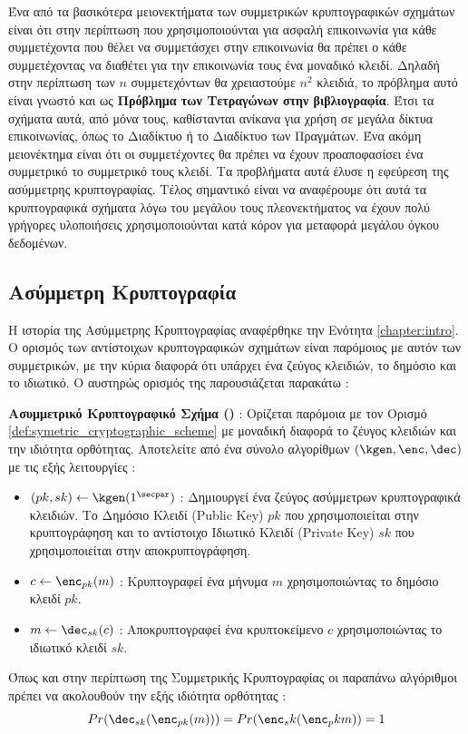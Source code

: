 Ένα από τα βασικότερα μειονεκτήματα των συμμετρικών κρυπτογραφικών σχημάτων είναι ότι στην περίπτωση που χρησιμοποιούνται για ασφαλή επικοινωνία για κάθε συμμετέχοντα που θέλει να συμμετάσχει στην επικοινωνία θα πρέπει ο κάθε συμμετέχοντας να διαθέτει για την επικοινωνία τους ένα μοναδικό κλειδί. Δηλαδή στην περίπτωση των $n$ συμμετεχόντων θα χρειαστούμε $n^2$ κλειδιά, το πρόβλημα αυτό είναι γνωστό και ως \textbf{Πρόβλημα των Τετραγώνων στην βιβλιογραφία}. Έτσι τα σχήματα αυτά, από μόνα τους, καθίστανται ανίκανα για χρήση σε μεγάλα δίκτυα επικοινωνίας, όπως το Διαδίκτυο ή το Διαδίκτυο των Πραγμάτων. Ένα ακόμη μειονέκτημα είναι ότι οι συμμετέχοντες θα πρέπει να έχουν προαποφασίσει ένα συμμετρικό το συμμετρικό τους κλειδί. Τα προβλήματα αυτά έλυσε η εφεύρεση της ασύμμετρης κρυπτογραφίας. Τέλος σημαντικό είναι να αναφέρουμε ότι αυτά τα κρυπτογραφικά σχήματα λόγω του μεγάλου τους πλεονεκτήματος να έχουν πολύ γρήγορες υλοποιήσεις χρησιμοποιούνται κατά κόρον για μεταφορά μεγάλου όγκου δεδομένων.

\subsection{Ασύμμετρη Κρυπτογραφία}

Η ιστορία της Ασύμμετρης Κρυπτογραφίας αναφέρθηκε την Ενότητα \ref{chapter:intro}. Ο ορισμός των αντίστοιχων κρυπτογραφικών σχημάτων είναι παρόμοιος με αυτόν των συμμετρικών, με την κύρια διαφορά ότι υπάρχει ένα ζεύγος κλειδιών, το δημόσιο και το ιδιωτικό. Ο αυστηρώς ορισμός της παρουσιάζεται παρακάτω :

\begin{definition}
\label{def:assymetric_cryptographic_scheme}
\textbf{Ασυμμετρικό Κρυπτογραφικό Σχήμα ()} : Ορίζεται παρόμοια με τον Ορισμό \ref{def:symetric_cryptographic_scheme} με μοναδική διαφορά το ζέυγος κλειδιών και την ιδιότητα ορθότητας. Αποτελείτε από ένα σύνολο αλγορίθμων $(\kgen, \enc, \dec)$ με τις εξής λειτουργίες :
\begin{itemize}
    \item $(pk, sk) \leftarrow \kgen(1^\secpar)$ : Δημιουργεί ένα ζεύγος ασύμμετρων κρυπτογραφικά κλειδιών. Το Δημόσιο Κλειδί (Public Key) $pk$ που χρησιμοποιείται στην κρυπτογράφηση και το αντίστοιχο Ιδιωτικό Κλειδί (Private Key) $sk$ που χρησιμοποιείται στην αποκρυπτογράφηση.
    \item $c \leftarrow \enc_{pk}(m)$ : Κρυπτογραφεί ένα μήνυμα $m$ χρησιμοποιώντας το δημόσιο κλειδί $pk$.
    \item $m \leftarrow \dec_{sk}(c)$ : Αποκρυπτογραφεί ένα κρυπτοκείμενο $c$ χρησιμοποιώντας το ιδιωτικό κλειδί $sk$.
\end{itemize}
Όπως και στην περίπτωση της Συμμετρικής Κρυπτογραφίας οι παραπάνω αλγόριθμοι πρέπει να ακολουθούν την εξής ιδιότητα ορθότητας :
$$
    Pr(\dec_{sk}(\enc_{pk}(m))) = Pr(\enc_sk(\enc_pk{m})) = 1
$$
\end{definition}


